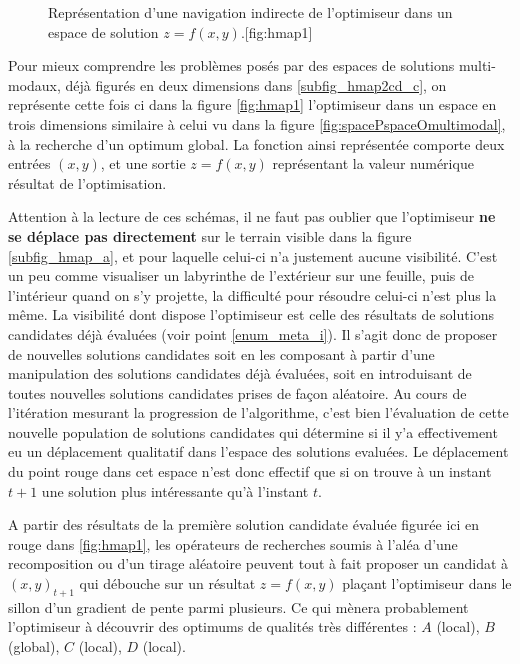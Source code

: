 \begin{figure}[!htbp]
\begin{sidecaption}[fortoc]{Représentation d'une navigation indirecte de l'optimiseur dans un espace de solution $z = f(x,y)$.}[fig:hmap1]
  \centering
  \qquad
\end{sidecaption}
\end{figure}

Pour mieux comprendre les problèmes posés par des espaces de solutions multi-modaux, déjà figurés en deux dimensions dans \ref{subfig_hmap2cd_c}, on représente cette fois ci dans la figure \ref{fig:hmap1} l'optimiseur dans un espace en trois dimensions similaire à celui vu dans la figure \ref{fig:spacePspaceOmultimodal}, à la recherche d'un optimum global. La fonction ainsi représentée comporte deux entrées $(x,y)$, et une sortie $z = f(x,y)$ représentant la valeur numérique résultat de l'optimisation.

Attention à la lecture de ces schémas, il ne faut pas oublier que l'optimiseur \textbf{ne se déplace pas directement} sur le terrain visible dans la figure \ref{subfig_hmap_a}, et pour laquelle celui-ci n'a justement aucune visibilité. C'est un peu comme visualiser un labyrinthe de l'extérieur sur une feuille, puis de l'intérieur quand on s'y projette, la difficulté pour résoudre celui-ci n'est plus la même. La visibilité dont dispose l'optimiseur est celle des résultats de solutions candidates déjà évaluées (voir point \ref{enum_meta_i}). Il s'agit donc de proposer de nouvelles solutions candidates soit en les composant à partir d'une manipulation des solutions candidates déjà évaluées, soit en introduisant de toutes nouvelles solutions candidates prises de façon aléatoire. Au cours de l'itération mesurant la progression de l'algorithme, c'est bien l'évaluation de cette nouvelle population de solutions candidates qui détermine si il y'a effectivement eu un déplacement qualitatif dans l'espace des solutions evaluées. Le déplacement du point rouge dans cet espace n'est donc effectif que si on trouve à un instant $t + 1$ une solution plus intéressante qu'à l'instant $t$.

A partir des résultats de la première solution candidate évaluée figurée ici en rouge dans \ref{fig:hmap1}, les opérateurs de recherches soumis à l'aléa d'une recomposition ou d'un tirage aléatoire peuvent tout à fait proposer un candidat à $(x,y)_{t+1}$ qui débouche sur un résultat $z = f(x,y)$ plaçant l'optimiseur dans le sillon d'un gradient de pente parmi plusieurs. Ce qui mènera probablement l'optimiseur à découvrir des optimums de qualités très différentes : $A$ (local), $B$ (global), $C$ (local), $D$ (local). 


